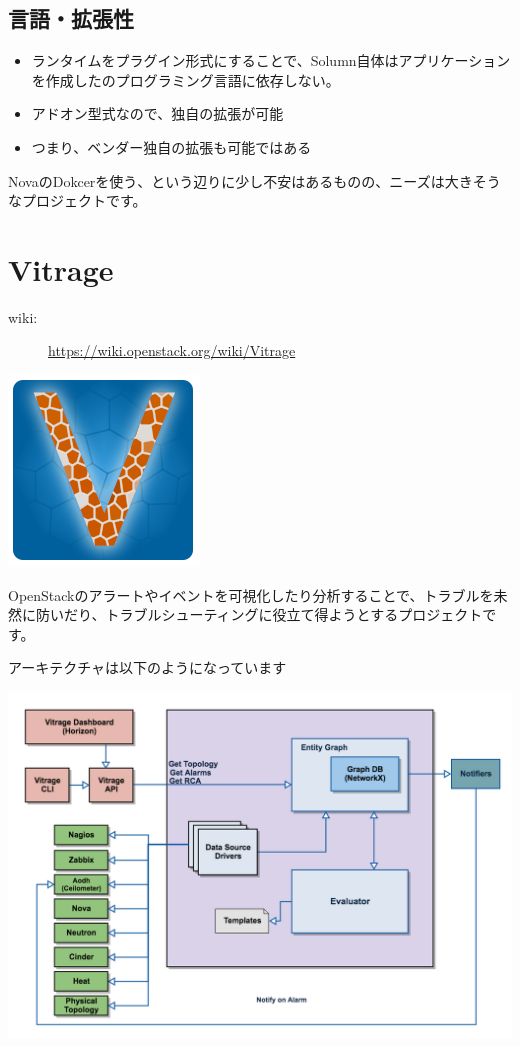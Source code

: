 \subsection*{言語・拡張性}
\begin{itemize}
	\item ランタイムをプラグイン形式にすることで、Solumn自体はアプリケーションを作成したのプログラミング言語に依存しない。
	\item アドオン型式なので、独自の拡張が可能
	\item つまり、ベンダー独自の拡張も可能ではある
\end{itemize}

NovaのDokcerを使う、という辺りに少し不安はあるものの、ニーズは大きそうなプロジェクトです。

\section{Vitrage}
\begin{description}
	\item[wiki:] \url{https://wiki.openstack.org/wiki/Vitrage}
\end{description}

\includegraphics{img/Vitrage_logo_finaly.png}

OpenStackのアラートやイベントを可視化したり分析することで、トラブルを未然に防いだり、トラブルシューティングに役立て得ようとするプロジェクトです。

アーキテクチャは以下のようになっています

\includegraphics[width=\textwidth]{img/Vitrage-high_level_architecture2.png}

